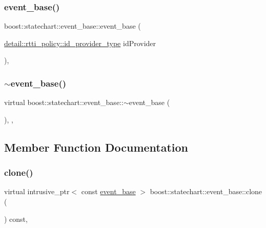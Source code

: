 \subsubsection{\texorpdfstring{event\+\_\+base()}{event\_base()}}
{\footnotesize\ttfamily boost\+::statechart\+::event\+\_\+base\+::event\+\_\+base (\begin{DoxyParamCaption}\item[{\mbox{\hyperlink{structboost_1_1statechart_1_1detail_1_1rtti__policy_afd9bc153e4b739bd085ea646f21c3cba}{detail\+::rtti\+\_\+policy\+::id\+\_\+provider\+\_\+type}}}]{id\+Provider }\end{DoxyParamCaption})\hspace{0.3cm}{\ttfamily [inline]}, {\ttfamily [protected]}}

\mbox{\label{classboost_1_1statechart_1_1event__base_a140c3bb51e5409101970b4c7d299e4e8}} 
\subsubsection{\texorpdfstring{$\sim$event\+\_\+base()}{~event\_base()}}
{\footnotesize\ttfamily virtual boost\+::statechart\+::event\+\_\+base\+::$\sim$event\+\_\+base (\begin{DoxyParamCaption}{ }\end{DoxyParamCaption})\hspace{0.3cm}{\ttfamily [inline]}, {\ttfamily [protected]}, {\ttfamily [virtual]}}



\subsection{Member Function Documentation}
\mbox{\label{classboost_1_1statechart_1_1event__base_a72e40beb11e594199e6d4d62ae6c57d3}} 
\subsubsection{\texorpdfstring{clone()}{clone()}}
{\footnotesize\ttfamily virtual intrusive\+\_\+ptr$<$ const \mbox{\hyperlink{classboost_1_1statechart_1_1event__base}{event\+\_\+base}} $>$ boost\+::statechart\+::event\+\_\+base\+::clone (\begin{DoxyParamCaption}{ }\end{DoxyParamCaption}) const\hspace{0.3cm}{\ttfamily [private]}, {}}




